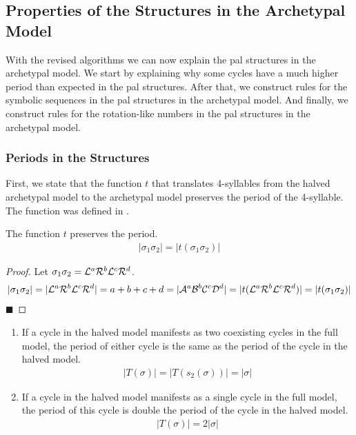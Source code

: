 \subsection{Properties of the  Structures in the Archetypal Model}
\label{sec:add.rules.pal}

With the revised algorithms we can now explain the \gls{pal} structures in the archetypal model.
We start by explaining why some cycles have a much higher period than expected in the \gls{pal} structures.
After that, we construct rules for the symbolic sequences in the \gls{pal} structures in the archetypal model.
And finally, we construct rules for the rotation-like numbers in the \gls{pal} structures in the archetypal model.

\subsubsection{Periods in the  Structures}

First, we state that the function $t$ that translates 4-syllables from the halved archetypal model to the archetypal model preserves the period of the 4-syllable.
The function was defined in .

\begin{lemma}
	\label{lemma:t.preserves.period}
	The function $t$ preserves the period.
	\begin{align}
		|\sigma_1\sigma_2| = |t(\sigma_1\sigma_2)|
	\end{align}
\end{lemma}

\begin{proof}
	Let $\sigma_1\sigma_2 = \mathcal{L}^a\mathcal{R}^b\mathcal{L}^c\mathcal{R}^d$.
	\begin{align*}
		|\sigma_1\sigma_2| =  |\mathcal{L}^a\mathcal{R}^b\mathcal{L}^c\mathcal{R}^d|
		= a + b + c + d
		= |\mathcal{A}^a\mathcal{B}^b\mathcal{C}^c\mathcal{D}^d|
		= |t(\mathcal{L}^a\mathcal{R}^b\mathcal{L}^c\mathcal{R}^d)|
		= |t(\sigma_1\sigma_2)|
	\end{align*}
	\hfill $\blacksquare$
\end{proof}

\begin{theorem}
	\begin{enumerate}
		\item If a cycle in the halved model manifests as two coexisting cycles in the full model, the period of either cycle is the same as the period of the cycle in the halved model.
		      \begin{align*}
			      |T(\sigma)| = |T(s_2(\sigma))| = |\sigma|
		      \end{align*}
		\item If a cycle in the halved model manifests as a single cycle in the full model, the period of this cycle is double the period of the cycle in the halved model.
		      \begin{align*}
			      |T(\sigma)| = 2 |\sigma|
		      \end{align*}
	\end{enumerate}
\end{theorem}

